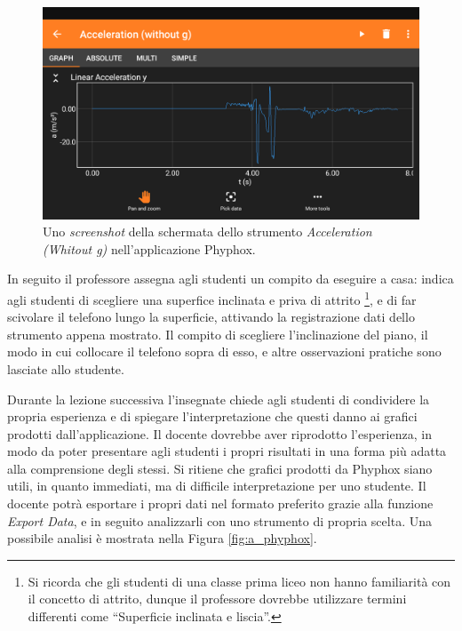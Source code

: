 \documentclass{report} \usepackage[T1]{fontenc} \usepackage[italian]{babel}
\begin{document}
\begin{figure}[H]
\centering
  \includegraphics[width=\textwidth]{phyphox}
  \caption{Uno \emph{screenshot} della schermata dello strumento
           \emph{Acceleration (Whitout g)}
           nell'applicazione Phyphox.}
  \label{fig:phyphox}
\end{figure}

In seguito il professore assegna agli studenti un compito da eseguire
a casa: indica agli studenti di scegliere una superfice inclinata
e priva di attrito
\footnote{
          Si ricorda che gli studenti di una classe prima liceo
          non hanno familiarità con il concetto di attrito,
          dunque il professore dovrebbe utilizzare termini differenti
          come ``Superficie inclinata e liscia''.
         },
e di far scivolare il telefono lungo la superficie, attivando
la registrazione dati dello strumento appena mostrato.
Il compito di scegliere l'inclinazione del piano, il modo in cui
collocare il telefono sopra di esso, e altre osservazioni pratiche
sono lasciate allo studente.

Durante la lezione successiva l'insegnate chiede agli studenti
di condividere la propria esperienza e di spiegare l'interpretazione
che questi danno ai grafici prodotti dall'applicazione.
Il docente dovrebbe aver riprodotto l'esperienza, in modo
da poter presentare agli studenti i propri risultati in una
forma più adatta alla comprensione degli stessi.
Si ritiene che grafici prodotti da Phyphox siano utili,
in quanto immediati, ma di difficile interpretazione
per uno studente. Il docente potrà esportare i propri
dati nel formato preferito grazie alla funzione
\emph{Export Data}, e in seguito analizzarli con uno
strumento di propria scelta.
Una possibile analisi è mostrata nella Figura \ref{fig:a_phyphox}.
\end{document}
